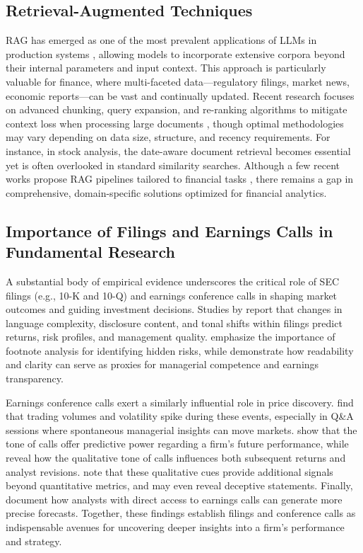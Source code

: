 \subsection{Retrieval-Augmented Techniques}
RAG \cite{lewis2020retrieval} has emerged as one of the most prevalent applications of LLMs in production systems \cite{menlo_ventures_2024}, allowing models to incorporate extensive corpora beyond their internal parameters and input context. This approach is particularly valuable for finance, where multi-faceted data—regulatory filings, market news, economic reports—can be vast and continually updated. Recent research focuses on advanced chunking, query expansion, and re-ranking algorithms to mitigate context loss when processing large documents \cite{setty2024improving, yepes2024financial}, though optimal methodologies may vary depending on data size, structure, and recency requirements. For instance, in stock analysis, the date-aware document retrieval becomes essential yet is often overlooked in standard similarity searches. Although a few recent works propose RAG pipelines tailored to financial tasks \cite{arslan2024business, zhang2023enhancing}, there remains a gap in comprehensive, domain-specific solutions optimized for financial analytics.

\subsection{Importance of Filings and Earnings Calls in Fundamental Research}
A substantial body of empirical evidence underscores the critical role of SEC filings (e.g., 10-K and 10-Q) and earnings conference calls in shaping market outcomes and guiding investment decisions. Studies by \cite{loughran2011liability, eugene1992relationship} report that changes in language complexity, disclosure content, and tonal shifts within filings predict returns, risk profiles, and management quality. \cite{campbell2008search, mayew2015md} emphasize the importance of footnote analysis for identifying hidden risks, while \cite{dikolli2019cfo} demonstrate how readability and clarity can serve as proxies for managerial competence and earnings transparency.

Earnings conference calls exert a similarly influential role in price discovery. \cite{frankel1999empirical} find that trading volumes and volatility spike during these events, especially in Q\&A sessions where spontaneous managerial insights can move markets. \cite{mayew2012power} show that  the tone of calls offer predictive power regarding a firm’s future performance, while \cite{price2012earnings} reveal how the qualitative tone of calls influences both subsequent returns and analyst revisions. \cite{li2008annual, larcker2012detecting} note that these qualitative cues provide additional signals beyond quantitative metrics, and may even reveal deceptive statements. Finally, \cite{mayew2015md} document how analysts with direct access to earnings calls can generate more precise forecasts. Together, these findings establish filings and conference calls as indispensable avenues for uncovering deeper insights into a firm’s performance and strategy.

